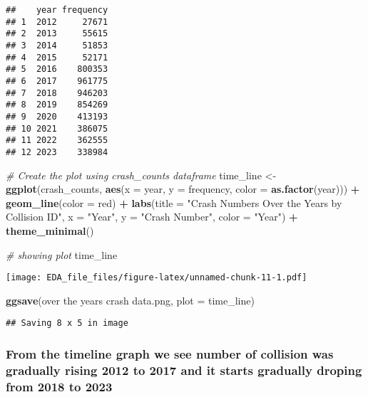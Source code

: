 \documentclass[
]{article}
\newenvironment{Shaded}{\begin{snugshade}}{\end{snugshade}}
\newcommand{\AttributeTok}[1]{\textcolor[rgb]{0.13,0.29,0.53}{#1}}
\newcommand{\CommentTok}[1]{\textcolor[rgb]{0.56,0.35,0.01}{\textit{#1}}}
\newcommand{\FunctionTok}[1]{\textcolor[rgb]{0.13,0.29,0.53}{\textbf{#1}}}
\newcommand{\NormalTok}[1]{#1}
\newcommand{\OtherTok}[1]{\textcolor[rgb]{0.56,0.35,0.01}{#1}}
\newcommand{\SpecialCharTok}[1]{\textcolor[rgb]{0.81,0.36,0.00}{\textbf{#1}}}
\newcommand{\StringTok}[1]{\textcolor[rgb]{0.31,0.60,0.02}{#1}}
\begin{document}
\begin{verbatim}
##    year frequency
## 1  2012     27671
## 2  2013     55615
## 3  2014     51853
## 4  2015     52171
## 5  2016    800353
## 6  2017    961775
## 7  2018    946203
## 8  2019    854269
## 9  2020    413193
## 10 2021    386075
## 11 2022    362555
## 12 2023    338984
\end{verbatim}

\begin{Shaded}
\begin{Highlighting}[]
\CommentTok{\# Create the plot using crash\_counts dataframe}
\NormalTok{time\_line }\OtherTok{\textless{}{-}} \FunctionTok{ggplot}\NormalTok{(crash\_counts, }\FunctionTok{aes}\NormalTok{(}\AttributeTok{x =}\NormalTok{ year, }\AttributeTok{y =}\NormalTok{ frequency, }\AttributeTok{color =} \FunctionTok{as.factor}\NormalTok{(year))) }\SpecialCharTok{+}
  \FunctionTok{geom\_line}\NormalTok{(}\AttributeTok{color =} \StringTok{\textquotesingle{}red\textquotesingle{}}\NormalTok{) }\SpecialCharTok{+}
  \FunctionTok{labs}\NormalTok{(}\AttributeTok{title =} \StringTok{"Crash Numbers Over the Years by Collision ID"}\NormalTok{,}
       \AttributeTok{x =} \StringTok{"Year"}\NormalTok{,}
       \AttributeTok{y =} \StringTok{"Crash Number"}\NormalTok{,}
       \AttributeTok{color =} \StringTok{"Year"}\NormalTok{) }\SpecialCharTok{+}
  \FunctionTok{theme\_minimal}\NormalTok{()}

\CommentTok{\# showing plot}
\NormalTok{time\_line}
\end{Highlighting}
\end{Shaded}

\texttt{[image: EDA\_file\_files/figure-latex/unnamed-chunk-11-1.pdf]}

\begin{Shaded}
\begin{Highlighting}[]
\FunctionTok{ggsave}\NormalTok{(}\StringTok{\textquotesingle{}over the years crash data.png\textquotesingle{}}\NormalTok{, }\AttributeTok{plot =}\NormalTok{ time\_line)}
\end{Highlighting}
\end{Shaded}

\begin{verbatim}
## Saving 8 x 5 in image
\end{verbatim}

\hypertarget{from-the-timeline-graph-we-see-number-of-collision-was-gradually-rising-2012-to-2017-and-it-starts-gradually-droping-from-2018-to-2023}{%
\subsubsection{From the timeline graph we see number of collision was
gradually rising 2012 to 2017 and it starts gradually droping from 2018
to
2023}\label{from-the-timeline-graph-we-see-number-of-collision-was-gradually-rising-2012-to-2017-and-it-starts-gradually-droping-from-2018-to-2023}}
\end{document}
